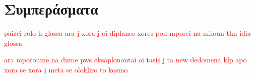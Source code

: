 \documentclass[12pt]{article}
\begin{document}
	
	
	\newpage
	\section{Συμπεράσματα}
	
	\textcolor{red}{paizei rolo h glossa ara j xora j oi diplanes xores pou mporei na miloun thn idia glossa}
	
	\vspace{12pt}
	\textcolor{red}{ara mporoume na dume pws eksaplonontai oi tasis j ta new dedomena klp apo xora se xora j meta se olokliro to kosmo}
	
	\label{chap:simperasmata_14}	
\end{document}
